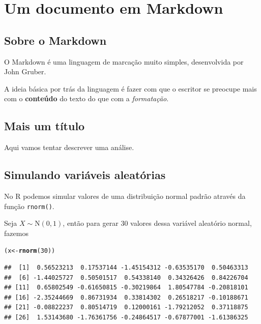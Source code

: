 \documentclass{article}\usepackage[]{graphicx}\usepackage[]{color}
\makeatletter
\newcommand{\hlnum}[1]{\textcolor[rgb]{0.686,0.059,0.569}{#1}}%
\newcommand{\hlstd}[1]{\textcolor[rgb]{0.345,0.345,0.345}{#1}}%
\newcommand{\hlkwb}[1]{\textcolor[rgb]{0.69,0.353,0.396}{#1}}%
\newcommand{\hlkwd}[1]{\textcolor[rgb]{0.737,0.353,0.396}{\textbf{#1}}}%
\newenvironment{kframe}{%
 \def\at@end@of@kframe{}%
 \ifinner\ifhmode%
  \def\at@end@of@kframe{\end{minipage}}%
  \begin{minipage}{\columnwidth}%
 \fi\fi%
 \def\FrameCommand##1{\hskip\@totalleftmargin \hskip-\fboxsep
 \colorbox{shadecolor}{##1}\hskip-\fboxsep
     \hskip-\linewidth \hskip-\@totalleftmargin \hskip\columnwidth}%
 \MakeFramed {\advance\hsize-\width
   \@totalleftmargin\z@ \linewidth\hsize
   \@setminipage}}%
 {\par\unskip\endMakeFramed%
 \at@end@of@kframe}
\newenvironment{knitrout}{}{} %
\makeatother
\begin{document}
\section{Um documento em Markdown}

\subsection{Sobre o Markdown}

O Markdown é uma linguagem de marcação muito simples, desenvolvida por
John Gruber.

A ideia básica por trás da linguagem é fazer com que o escritor se
preocupe mais com o \textbf{conteúdo} do texto do que com a
\emph{formatação}.

\subsection{Mais um título}

Aqui vamos tentar descrever uma análise.

\subsection{Simulando variáveis aleatórias}

No R podemos simular valores de uma distribuição normal padrão através
da função \texttt{rnorm()}.

Seja $X \sim \text{N}(0,1)$, então para gerar 30 valores dessa
variável aleatório normal, fazemos

\begin{knitrout}
\color{fgcolor}\begin{kframe}
\begin{alltt}
\hlstd{(x} \hlkwb{<-} \hlkwd{rnorm}\hlstd{(}\hlnum{30}\hlstd{))}
\end{alltt}
\begin{verbatim}
##  [1]  0.56523213  0.17537144 -1.45154312 -0.63535170  0.50463313
##  [6] -1.44025727  0.50501517  0.54338140  0.34326426  0.84226704
## [11]  0.65802549 -0.61650815 -0.30219864  1.80547784 -0.20818101
## [16] -2.35244669  0.86731934  0.33814302  0.26518217 -0.10188671
## [21] -0.08822237  0.80514719  0.12000161 -1.79212052  0.37118875
## [26]  1.53143680 -1.76361756 -0.24864517 -0.67877001 -1.61386325
\end{verbatim}
\end{kframe}
\end{knitrout}
\end{document}
